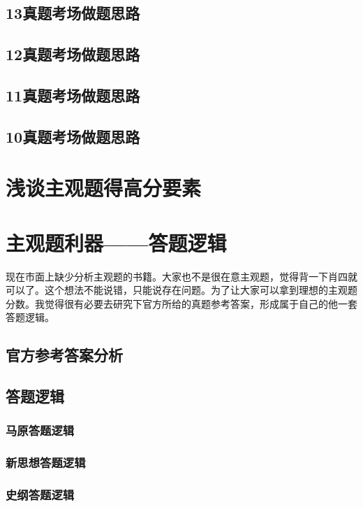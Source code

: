 \documentclass[lang=cn,blue,10pt,scheme=chinese,twocol]{zznote}
\begin{document}
\section{13真题考场做题思路}
\section{12真题考场做题思路}
\section{11真题考场做题思路}
\section{10真题考场做题思路}

\chapter{浅谈主观题得高分要素}





\chapter{主观题利器——答题逻辑}

现在市面上缺少分析主观题的书籍。大家也不是很在意主观题，觉得背一下肖四就可以了。这个想法不能说错，只能说存在问题。为了让大家可以拿到理想的主观题分数。我觉得很有必要去研究下官方所给的真题参考答案，形成属于自己的他一套答题逻辑。

\section{官方参考答案分析}



\section{答题逻辑}

\subsection{马原答题逻辑}
\subsection{新思想答题逻辑}
\subsection{史纲答题逻辑}
\end{document}
